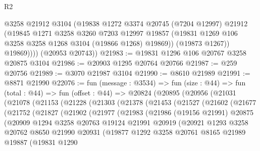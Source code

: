 \begin{lexlean}{R2}
\begin{coremodule}
              @3258
              @21912
              @3104
              (@19838
                @1272
                @3374
                @20745
                (@7204 @12997)
                @21912
                (@19845
                  @1271
                  @3258
                  @3260
                  @7203
                  @12997
                  @19857
                  (@19831 @1269 @106 @3258 @3258 @1268 @3104 (@19866 @1268) @19869))
                (@19873 @1267))
              @19869))))
      (@20953 @20743))
@21983 := @19831 @1296 @106 @20767 @3258 @20875 @3104
@21986 := @20903 @1295 @20764 @20766
@21987 := @259 @20756
@21989 := @3070 @21987 @3104
@21990 := @8610 @21989
@21991 := @8871 @21990
@22076 := fun (message : @3534) =>
  fun (size : @44) =>
  fun (total : @44) =>
  fun (offset : @44) =>
  @20824
    (@20895
      (@20956
        (@21031
          (@21078
            (@21153
              (@21228
                (@21303
                  (@21378
                    (@21453
                      (@21527
                        (@21602
                          (@21677
                            (@21752
                              (@21827
                                (@21902
                                  (@21977
                                    (@21983
                                      (@21986
                                        (@19156 @21991)
                                        @20875
                                        (@20909
                                          @1294
                                          @3258
                                          @20763
                                          @19124
                                          @21991
                                          @20919
                                          (@20921
                                            @1293
                                            @3258
                                            @20762
                                            @8650
                                            @21990
                                            @20931
                                            (@19877
                                              @1292
                                              @3258
                                              @20761
                                              @8165
                                              @21989
                                              @19887
                                              (@19831
                                                @1290

\end{coremodule}
\end{lexlean}
